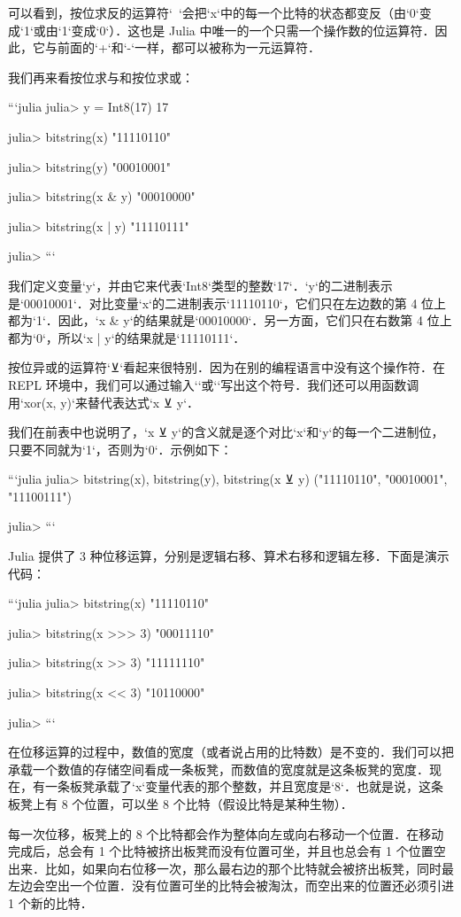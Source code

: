 可以看到，按位求反的运算符`~`会把`x`中的每一个比特的状态都变反（由`0`变成`1`或由`1`变成`0`）．这也是 Julia 中唯一的一个只需一个操作数的位运算符．因此，它与前面的`+`和`-`一样，都可以被称为一元运算符．

我们再来看按位求与和按位求或：

```julia
julia> y = Int8(17)
17

julia> bitstring(x)
"11110110"

julia> bitstring(y)
"00010001"

julia> bitstring(x & y)
"00010000"

julia> bitstring(x | y)
"11110111"

julia>
```

我们定义变量`y`，并由它来代表`Int8`类型的整数`17`．`y`的二进制表示是`00010001`．对比变量`x`的二进制表示`11110110`，它们只在左边数的第 4 位上都为`1`．因此，`x & y`的结果就是`00010000`．另一方面，它们只在右数第 4 位上都为`0`，所以`x | y`的结果就是`11110111`．

按位异或的运算符`⊻`看起来很特别．因为在别的编程语言中没有这个操作符．在 REPL 环境中，我们可以通过输入`\xor[Tab]`或`\veebar[Tab]`写出这个符号．我们还可以用函数调用`xor(x, y)`来替代表达式`x ⊻ y`．

我们在前表中也说明了，`x ⊻ y`的含义就是逐个对比`x`和`y`的每一个二进制位，只要不同就为`1`，否则为`0`．示例如下：

```julia
julia> bitstring(x), bitstring(y), bitstring(x ⊻ y)
("11110110", "00010001", "11100111")

julia> 
```

Julia 提供了 3 种位移运算，分别是逻辑右移、算术右移和逻辑左移．下面是演示代码：

```julia
julia> bitstring(x)
"11110110"

julia> bitstring(x >>> 3)
"00011110"

julia> bitstring(x >> 3)
"11111110"

julia> bitstring(x << 3)
"10110000"

julia>
```

在位移运算的过程中，数值的宽度（或者说占用的比特数）是不变的．我们可以把承载一个数值的存储空间看成一条板凳，而数值的宽度就是这条板凳的宽度．现在，有一条板凳承载了`x`变量代表的那个整数，并且宽度是`8`．也就是说，这条板凳上有 8 个位置，可以坐 8 个比特（假设比特是某种生物）．

每一次位移，板凳上的 8 个比特都会作为整体向左或向右移动一个位置．在移动完成后，总会有 1 个比特被挤出板凳而没有位置可坐，并且也总会有 1 个位置空出来．比如，如果向右位移一次，那么最右边的那个比特就会被挤出板凳，同时最左边会空出一个位置．没有位置可坐的比特会被淘汰，而空出来的位置还必须引进 1 个新的比特．

